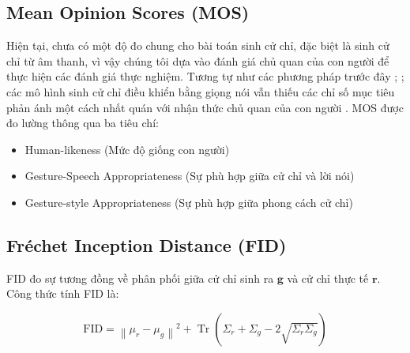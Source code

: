 \subsection{Mean Opinion Scores (MOS)}

Hiện tại, chưa có một độ đo chung cho bài toán sinh cử chỉ, đặc biệt là sinh cử chỉ từ âm thanh, vì vậy chúng tôi dựa vào đánh giá chủ quan của con người để thực hiện các đánh giá thực nghiệm. 
Tương tự như các phương pháp trước đây \cite{yoon2022genea}; \cite{kucherenko2021large}; các mô hình sinh cử chỉ điều khiển bằng giọng nói vẫn thiếu các chỉ số mục tiêu phản ánh một cách nhất quán với nhận thức chủ quan của con người  \cite{alexanderson2022listen}.
MOS được đo lường thông qua ba tiêu chí:

\begin{itemize}
	\item Human-likeness (Mức độ giống con người)
	\item Gesture-Speech Appropriateness (Sự phù hợp giữa cử chỉ và lời nói)
	\item Gesture-style Appropriateness (Sự phù hợp giữa phong cách cử chỉ)
\end{itemize}


\subsection{Fréchet Inception Distance (FID)}
FID đo sự tương đồng về phân phối giữa cử chỉ sinh ra $\mathbf{g}$ và cử chỉ thực tế $\mathbf{r}$. Công thức tính FID là:

\begin{equation}
	\text{FID} = \left\| \mu_r - \mu_g \right\|^2 + \operatorname{Tr}\left( \Sigma_r + \Sigma_g - 2 \sqrt{\Sigma_r \Sigma_g} \right)
\end{equation}


